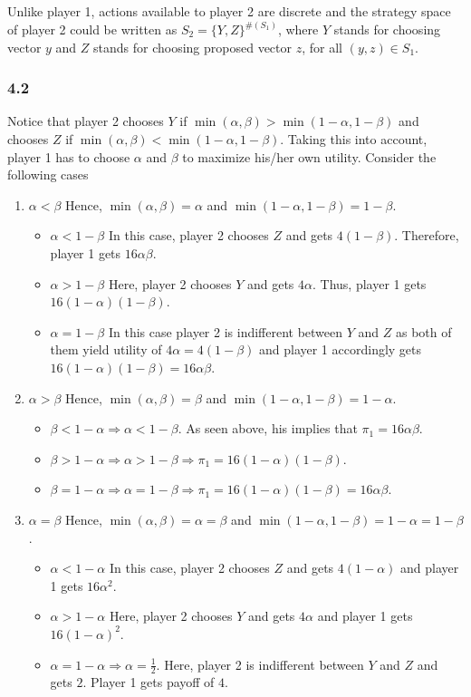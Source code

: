 \documentclass[]{article}
\begin{document}
Unlike player 1, actions available to player 2 are discrete and the strategy space of player 2 could be written as $S_2 = \{Y, Z\}^{\#(S_1)}$, where $Y$ stands for choosing vector $y$ and $Z$ stands for choosing proposed vector $z$, for all $(y,z)\in S_1$. 

 \subsubsection*{4.2}
Notice that player 2 chooses $Y$ if $\min(\alpha, \beta) > \min(1 - \alpha, 1 - \beta)$ and chooses $Z$ if $\min(\alpha, \beta) < \min(1 - \alpha, 1 - \beta)$. Taking this into account, player 1 has to choose $\alpha$ and $\beta$ to maximize his/her own utility. Consider the following cases
\begin{enumerate}[label=\alph*)]
	\item $\alpha < \beta$
	Hence, $\min(\alpha,\beta) = \alpha$ and $\min(1 - \alpha, 1 - \beta) = 1 - \beta$.
	\begin{itemize}
		\item $\alpha < 1 - \beta$
		In this case, player 2 chooses $Z$ and gets $4(1 - \beta)$. Therefore, player 1 gets $16\alpha\beta$.
		\item $\alpha > 1 - \beta$
		Here, player 2 chooses $Y$ and gets $4\alpha$. Thus, player 1 gets $16(1 - \alpha)(1 - \beta)$.
		\item $\alpha = 1 - \beta$
		In this case player 2 is indifferent between $Y$ and $Z$ as both of them yield utility of $4\alpha = 4(1 - \beta)$ and player 1 accordingly gets $16(1 - \alpha)(1 - \beta) = 16\alpha\beta$.
	\end{itemize}
	\item $\alpha > \beta$
	Hence, $\min(\alpha,\beta) = \beta$ and $\min(1 - \alpha, 1 - \beta) = 1 - \alpha$.
	\begin{itemize}
		\item $\beta < 1 - \alpha \Longrightarrow \alpha < 1 - \beta$. As seen above, his implies that $\pi_1 = 16\alpha\beta$.
		\item $\beta > 1 - \alpha \Longrightarrow \alpha > 1 - \beta \Longrightarrow \pi_1 = 16(1 - \alpha)(1 - \beta)$.
		\item $\beta = 1 - \alpha \Longrightarrow \alpha = 1 - \beta \Longrightarrow \pi_1 = 16(1 - \alpha)(1 - \beta) = 16\alpha\beta$.
	\end{itemize}
	\item $\alpha = \beta$
	Hence, $\min(\alpha,\beta) = \alpha = \beta$ and $\min(1 - \alpha, 1 - \beta) = 1 - \alpha = 1 - \beta$.
	\begin{itemize}
		\item $\alpha < 1 - \alpha$
		In this case, player 2 chooses $Z$ and gets $4(1 - \alpha)$ and player 1 gets $16\alpha^2$.
		\item $\alpha > 1 - \alpha$
		Here, player 2 chooses $Y$ and gets $4\alpha$ and player 1 gets $16(1 - \alpha)^2$.
		\item $\alpha = 1 - \alpha \Longrightarrow \alpha = \frac{1}{2}$.
		Here, player 2 is indifferent between $Y$ and $Z$ and gets $2$. Player 1 gets payoff of $4$.
	\end{itemize}
\end{enumerate}
\end{document}
